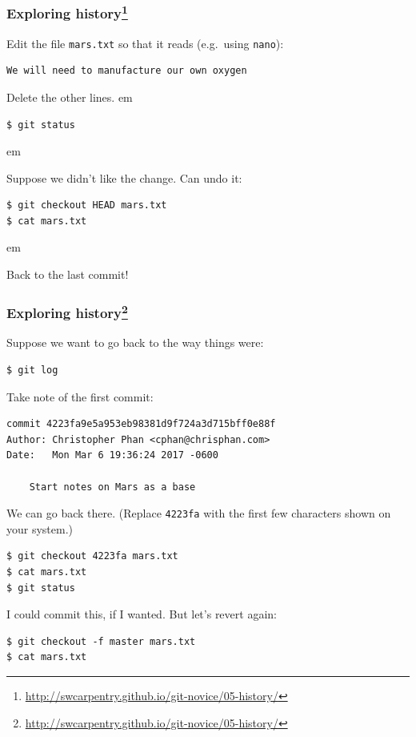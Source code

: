 \documentclass{beamer}
\begin{document}
\begin{frame}[fragile]
\frametitle{Exploring history\footnote{\url{http://swcarpentry.github.io/git-novice/05-history/}}}

Edit the file \texttt{mars.txt} so that it reads (e.g.~using \texttt{nano}):
\begin{verbatim}
We will need to manufacture our own oxygen
\end{verbatim}
Delete the other lines.
 em
\pause

\begin{verbatim}
$ git status
\end{verbatim}
\pause
{} em

Suppose we didn't like the change. Can undo it:
\begin{verbatim}
$ git checkout HEAD mars.txt
$ cat mars.txt
\end{verbatim}
\pause
{} em

Back to the last commit!

\end{frame}

\begin{frame}[fragile]
\frametitle{Exploring history\footnote{\url{http://swcarpentry.github.io/git-novice/05-history/}}}

Suppose we want to go back to the way things were:
\begin{verbatim}
$ git log
\end{verbatim}
\pause
Take note of the first commit:
\begin{verbatim}
commit 4223fa9e5a953eb98381d9f724a3d715bff0e88f
Author: Christopher Phan <cphan@chrisphan.com>
Date:   Mon Mar 6 19:36:24 2017 -0600

    Start notes on Mars as a base
\end{verbatim}
\pause

We can go back there. (Replace \texttt{4223fa} with the first few characters shown on your system.)
\begin{verbatim}
$ git checkout 4223fa mars.txt
$ cat mars.txt
$ git status
\end{verbatim}
\pause

I could commit this, if I wanted. But let's revert again:
\begin{verbatim}
$ git checkout -f master mars.txt
$ cat mars.txt
\end{verbatim}

\end{frame}
\end{document}
